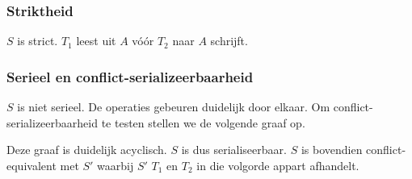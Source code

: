 \documentclass[transacties.tex]{subfiles}
\begin{document}
\subsubsection*{Striktheid}
$S$ is strict. $T_1$ leest uit $A$ v\'o\'or $T_2$ naar $A$ schrijft.

\subsubsection*{Serieel en conflict-serializeerbaarheid}
$S$ is niet serieel. De operaties gebeuren duidelijk door elkaar.
Om conflict-serializeerbaarheid te testen stellen we de volgende graaf op.
\begin{figure}[H]
\centering
{}
\end{figure}
Deze graaf is duidelijk acyclisch. $S$ is dus serialiseerbaar. $S$ is bovendien conflict-equivalent met $S'$ waarbij $S'$ $T_1$ en $T_2$ in die volgorde appart afhandelt.

\iffalse
\section{Timestamp ordering}
\subsection*{Opgave}

\subsection*{Antwoord}
\fi
\end{document}
